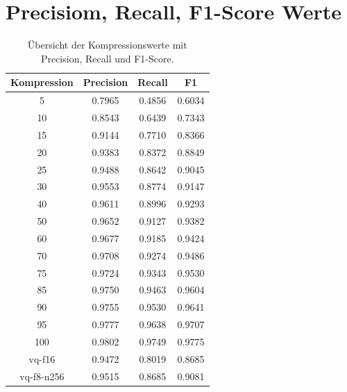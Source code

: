 \newpage
\section*{Precisiom, Recall, F1-Score Werte}
\begin{table}[h!]
\centering
\begin{tabular}{|c|c|c|c|}
\hline
\textbf{Kompression} & \textbf{Precision} & \textbf{Recall} & \textbf{F1} \\ \hline
5                    & 0.7965             & 0.4856          & 0.6034      \\ \hline
10                   & 0.8543             & 0.6439          & 0.7343      \\ \hline
15                   & 0.9144             & 0.7710          & 0.8366      \\ \hline
20                   & 0.9383             & 0.8372          & 0.8849      \\ \hline
25                   & 0.9488             & 0.8642          & 0.9045      \\ \hline
30                   & 0.9553             & 0.8774          & 0.9147      \\ \hline
40                   & 0.9611             & 0.8996          & 0.9293      \\ \hline
50                   & 0.9652             & 0.9127          & 0.9382      \\ \hline
60                   & 0.9677             & 0.9185          & 0.9424      \\ \hline
70                   & 0.9708             & 0.9274          & 0.9486      \\ \hline
75                   & 0.9724             & 0.9343          & 0.9530      \\ \hline
85                   & 0.9750             & 0.9463          & 0.9604      \\ \hline
90                   & 0.9755             & 0.9530          & 0.9641      \\ \hline
95                   & 0.9777             & 0.9638          & 0.9707      \\ \hline
100                  & 0.9802             & 0.9749          & 0.9775      \\ \hline
vq-f16              & 0.9472             & 0.8019          & 0.8685      \\ \hline
vq-f8-n256         & 0.9515             & 0.8685          & 0.9081      \\ \hline
\end{tabular}
\caption{Übersicht der Kompressionswerte mit Precision, Recall und F1-Score.}
\label{tab:compression_metrics}
\end{table}

